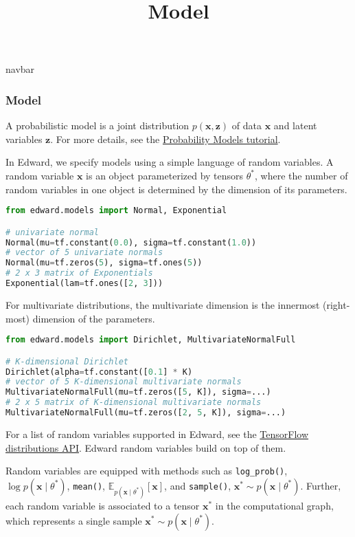 \title{Model}

{{navbar}}

\subsubsection{Model}

A probabilistic model is a joint distribution $p(\mathbf{x},
\mathbf{z})$ of data $\mathbf{x}$ and latent variables $\mathbf{z}$.
For more details, see the \href{/tutorials/model}{Probability Models tutorial}.

In Edward, we specify models using a simple language of random variables.
A random variable $\mathbf{x}$ is an object parameterized by
tensors $\theta^*$, where
the number of random variables in one object is determined by
the dimension of its parameters.

\begin{lstlisting}[language=Python]
from edward.models import Normal, Exponential

# univariate normal
Normal(mu=tf.constant(0.0), sigma=tf.constant(1.0))
# vector of 5 univariate normals
Normal(mu=tf.zeros(5), sigma=tf.ones(5))
# 2 x 3 matrix of Exponentials
Exponential(lam=tf.ones([2, 3]))
\end{lstlisting}

For multivariate distributions, the multivariate dimension is the
innermost (right-most) dimension of the parameters.

\begin{lstlisting}[language=Python]
from edward.models import Dirichlet, MultivariateNormalFull

# K-dimensional Dirichlet
Dirichlet(alpha=tf.constant([0.1] * K)
# vector of 5 K-dimensional multivariate normals
MultivariateNormalFull(mu=tf.zeros([5, K]), sigma=...)
# 2 x 5 matrix of K-dimensional multivariate normals
MultivariateNormalFull(mu=tf.zeros([2, 5, K]), sigma=...)
\end{lstlisting}

For a list of random variables supported in Edward, see the
\href{https://www.tensorflow.org/versions/master/api_docs/python/contrib.distributions.html}{TensorFlow distributions API}.
Edward random variables build on top of them.

Random variables are equipped with methods such as
\texttt{log_prob()}, $\log p(\mathbf{x}\mid\theta^*)$,
\texttt{mean()}, $\mathbb{E}_{p(\mathbf{x}\mid\theta^*)}[\mathbf{x}]$,
and \texttt{sample()}, $\mathbf{x}^*\sim p(\mathbf{x}\mid\theta^*)$.
Further, each random variable is associated to a tensor $\mathbf{x}^*$ in the
computational graph, which represents a single sample $\mathbf{x}^*\sim
p(\mathbf{x}\mid\theta^*)$.

